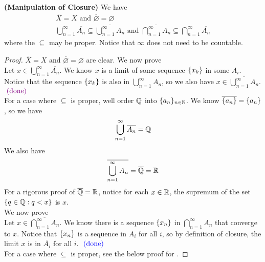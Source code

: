 \documentclass{report}
\begin{document}
\begin{theorem}
\label{1.2.3}
\textbf{(Manipulation of Closure)} We have
\begin{gather}
\overline{X}=X\text{ and }\overline{\varnothing}=\varnothing\\
\bigcup_{n=1}^\infty \overline{A_n}\subseteq \overline{\bigcup_{n=1}^\infty A_n}\text{ and }\overline{\bigcap_{n=1}^\infty A_n}\subseteq \bigcap_{n=1}^\infty \overline{A_n} 
\end{gather}
where the $\subseteq$ may be proper. Notice that $\infty$ does not need to be countable. 
\end{theorem}
\begin{proof}
$\overline{X}=X\text{ and }\overline{\varnothing}=\varnothing$ are clear. We now prove  \\

Let $x\in \bigcup_{n=1}^\infty \overline{A_n}$. We know $x$ is a limit of some sequence $\{ x_k \}$ in some $A_i$. Notice that the sequence $\{ x_k \}$ is also in $\bigcup_{n=1}^\infty A_n$, so we also have $x\in \overline{\bigcup_{n=1}^\infty A_n}$. $\textcolor{violet}{\text{ (done) }}$\\

For a case where $\subseteq$ is proper, well order $\mathbb{Q}$ into $\{ a_n \}_{n\in\mathbb{N}}$. We know $\overline{\{ a_n \}}=\{ a_n \}$, so we have
\begin{equation}
\bigcup _{n=1}^\infty \overline{A_n}=\mathbb{Q} 
\end{equation}
We also have
\begin{equation}
\overline{\bigcup_{n=1}^\infty A_n}=\overline{\mathbb{Q}}=\mathbb{R}
\end{equation}
For a rigorous proof of $\overline{\mathbb{Q}}=\mathbb{R}$, notice for each $x\in\mathbb{R}$, the supremum of the set $\{ q\in\mathbb{Q}: q<x \}$ is $x$.\\

We now prove \\

Let $x\in \overline{\bigcap _{n=1}^\infty A_n}$. We know there is a sequence $\{ x_n \}$ in $\bigcap _{n=1}^\infty A_n$ that converge to $x$. Notice that $\{ x_n \}$ is a sequence in $A_i$ for all  $i$, so by definition of closure, the limit  $x$ is in  $\overline{A_i}$ for all $i$. $\textcolor{blue}{\text{ (done) }}$\\

For a case where $\subseteq$ is proper, see the below proof for .
\end{proof}
\end{document}
